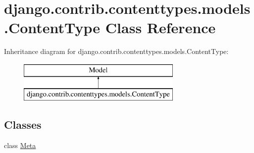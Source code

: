 \hypertarget{classdjango_1_1contrib_1_1contenttypes_1_1models_1_1_content_type}{}\section{django.\+contrib.\+contenttypes.\+models.\+Content\+Type Class Reference}
\label{classdjango_1_1contrib_1_1contenttypes_1_1models_1_1_content_type}
Inheritance diagram for django.\+contrib.\+contenttypes.\+models.\+Content\+Type\+:\begin{figure}[H]
\begin{center}
\leavevmode
\includegraphics[height=2.000000cm]{classdjango_1_1contrib_1_1contenttypes_1_1models_1_1_content_type}
\end{center}
\end{figure}
\subsection*{Classes}
\begin{DoxyCompactItemize}
\item 
class \mbox{\hyperlink{classdjango_1_1contrib_1_1contenttypes_1_1models_1_1_content_type_1_1_meta}{Meta}}
\end{DoxyCompactItemize}
